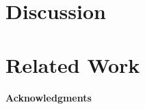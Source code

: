 \documentclass{article}
\theoremstyle{definition}
\theoremstyle{plain}
\theoremstyle{remark}
\begin{document}
\section{Discussion}

\section{Related Work}

\paragraph*{Acknowledgments}



\end{document}
